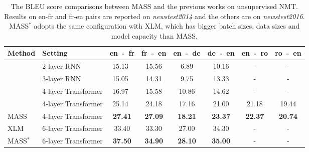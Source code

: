 \documentclass{article}
\begin{document}
	\begin{table*}[h]
		\small
		\centering
		\begin{tabular}{l|l|c c |  c c | c c}
			\toprule
Method & Setting & en~-~fr & fr~-~en & en~-~de & de~-~en &en~-~ro & ro~-~en \\
			\midrule
			\citet{artetxe2017unsupervised} & 2-layer RNN & 15.13~ & 15.56 & 6.89 & 10.16 & - & - \\
			\citet{lample2017unsupervised}  & 3-layer RNN & 15.05~ & 14.31 & 9.75  & 13.33 & - & - \\
			\citet{yang2018unsupervised}    & 4-layer Transformer & 16.97~ & 15.58 & 10.86 & 14.62 & - & - \\
			
			\citet{DBLP:conf/emnlp/LampleOCDR18} & 4-layer Transformer & 25.14~ & 24.18 & 17.16 & 21.00 & 21.18 & 19.44 \\
			\midrule
			MASS 		& 4-layer Transformer & \textbf{27.41} & \textbf{27.09} & \textbf{18.21} & \textbf{23.37} & \textbf{22.37} & \textbf{20.74} \\
			\bottomrule
			\toprule
			
			XLM~\citep{Lample2019MLM}  			& 6-layer Transformer & 33.40 & 33.30 & 27.00 & 34.30 & - & - \\
			\midrule
			
			MASS$^*$ & 6-layer Transformer & \textbf{37.50} & \textbf{34.90} & \textbf{28.10} & \textbf{35.00} & - & - \\
			\bottomrule
			
		\end{tabular}
		\vspace{-0.2cm}
		\caption{The BLEU score comparisons between MASS and the previous works on unsupervised NMT. Results on en-fr and fr-en pairs are reported on \emph{newstest2014} and the others are on \emph{newstest2016}. MASS$^*$ adopts the same configuration with XLM, which has bigger batch sizes, data sizes and model capacity than MASS.}
		\label{table_unsup_result}
	\end{table*}
	\fi
\end{document}
